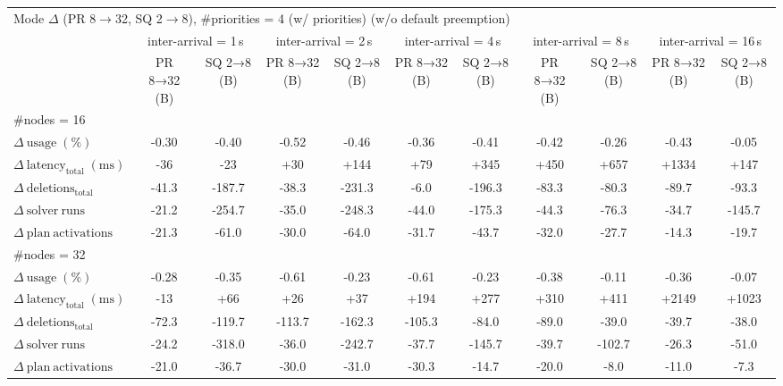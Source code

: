 
\begin{tabular}{l c c c c c c c c c c}
\toprule
\multicolumn{11}{l}{Mode $\Delta$ (PR 8$\rightarrow$32, SQ 2$\rightarrow$8), \#priorities = 4 (w/ priorities) (w/o default preemption)} \\
\addlinespace[0.2em]
 & \multicolumn{2}{c}{inter-arrival = 1\,s} & \multicolumn{2}{c}{inter-arrival = 2\,s} & \multicolumn{2}{c}{inter-arrival = 4\,s} & \multicolumn{2}{c}{inter-arrival = 8\,s} & \multicolumn{2}{c}{inter-arrival = 16\,s} \\
\cmidrule(lr){2-3}\cmidrule(lr){4-5}\cmidrule(lr){6-7}\cmidrule(lr){8-9}\cmidrule(lr){10-11}
 & PR 8→32 (B) & SQ 2→8 (B) & PR 8→32 (B) & SQ 2→8 (B) & PR 8→32 (B) & SQ 2→8 (B) & PR 8→32 (B) & SQ 2→8 (B) & PR 8→32 (B) & SQ 2→8 (B) \\
\midrule
\multicolumn{11}{l}{\#nodes = 16} \\
\midrule
$\Delta\ \mathrm{usage}\;(\%)$ & -0.30 & -0.40 & -0.52 & -0.46 & -0.36 & -0.41 & -0.42 & -0.26 & -0.43 & -0.05 \\
$\Delta\ \mathrm{latency}_{\mathrm{total}}\;(\mathrm{ms})$ & -36 & -23 & +30 & +144 & +79 & +345 & +450 & +657 & +1334 & +147 \\
$\Delta\ \mathrm{deletions}_{\mathrm{total}}$ & -41.3 & -187.7 & -38.3 & -231.3 & -6.0 & -196.3 & -83.3 & -80.3 & -89.7 & -93.3 \\
$\Delta\ \mathrm{solver\ runs}$ & -21.2 & -254.7 & -35.0 & -248.3 & -44.0 & -175.3 & -44.3 & -76.3 & -34.7 & -145.7 \\
$\Delta\ \mathrm{plan\ activations}$ & -21.3 & -61.0 & -30.0 & -64.0 & -31.7 & -43.7 & -32.0 & -27.7 & -14.3 & -19.7 \\
\midrule
\multicolumn{11}{l}{\#nodes = 32} \\
\midrule
$\Delta\ \mathrm{usage}\;(\%)$ & -0.28 & -0.35 & -0.61 & -0.23 & -0.61 & -0.23 & -0.38 & -0.11 & -0.36 & -0.07 \\
$\Delta\ \mathrm{latency}_{\mathrm{total}}\;(\mathrm{ms})$ & -13 & +66 & +26 & +37 & +194 & +277 & +310 & +411 & +2149 & +1023 \\
$\Delta\ \mathrm{deletions}_{\mathrm{total}}$ & -72.3 & -119.7 & -113.7 & -162.3 & -105.3 & -84.0 & -89.0 & -39.0 & -39.7 & -38.0 \\
$\Delta\ \mathrm{solver\ runs}$ & -24.2 & -318.0 & -36.0 & -242.7 & -37.7 & -145.7 & -39.7 & -102.7 & -26.3 & -51.0 \\
$\Delta\ \mathrm{plan\ activations}$ & -21.0 & -36.7 & -30.0 & -31.0 & -30.3 & -14.7 & -20.0 & -8.0 & -11.0 & -7.3 \\
\bottomrule
\end{tabular}

